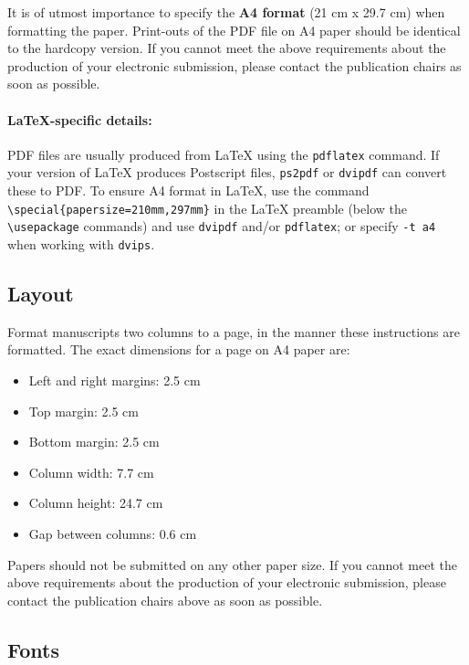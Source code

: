  It is of utmost importance to specify the \textbf{A4 format} (21 cm x 29.7 cm) when formatting the paper.
 Print-outs of the PDF file on A4 paper should be identical to the hardcopy version.
 If you cannot meet the above requirements about the production of your electronic submission, please contact the publication chairs as soon as possible.
 
 \paragraph{\LaTeX-specific details:}
 PDF files are usually produced from \LaTeX{} using the \texttt{\small pdflatex} command.
 If your version of \LaTeX{} produces Postscript files, \texttt{\small ps2pdf} or \texttt{\small dvipdf} can convert these to PDF.
 To ensure A4 format in \LaTeX, use the command {\small\verb|\special{papersize=210mm,297mm}|}
 in the \LaTeX{} preamble (below the {\small\verb|\usepackage|} commands) and use \texttt{\small dvipdf} and/or \texttt{\small pdflatex}; or specify \texttt{\small -t a4} when working with \texttt{\small dvips}.
 
 \subsection{Layout}
 \label{ssec:layout}
 
 Format manuscripts two columns to a page, in the manner these
 instructions are formatted.
 The exact dimensions for a page on A4 paper are:
 
 \begin{itemize}
 	\item Left and right margins: 2.5 cm
 	\item Top margin: 2.5 cm
 	\item Bottom margin: 2.5 cm
 	\item Column width: 7.7 cm
 	\item Column height: 24.7 cm
 	\item Gap between columns: 0.6 cm
 \end{itemize}
 
 \noindent Papers should not be submitted on any other paper size.
 If you cannot meet the above requirements about the production of your electronic submission, please contact the publication chairs above as soon as possible.
 
 \subsection{Fonts}
 
